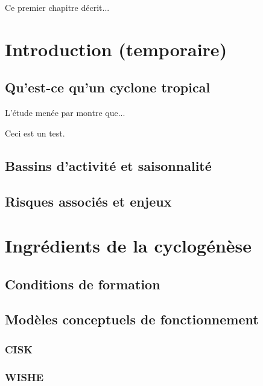 \documentclass[../main.tex]{subfiles}
\begin{document}
\begin{itshape}
Ce premier chapitre décrit...
\end{itshape}

\minitoc
\section{Introduction (temporaire)}

\subsection{Qu'est-ce qu'un cyclone tropical}

L'étude menée par \autocite{chauvin_response_2006} montre que...

Ceci est un test.

\subsection{Bassins d'activité et saisonnalité}

\subsection{Risques associés et enjeux}

\section{Ingrédients de la cyclogénèse}
  
\subsection{Conditions de formation}

\subsection{Modèles conceptuels de fonctionnement}

\subsubsection{CISK}

\subsubsection{WISHE}
\end{document}
